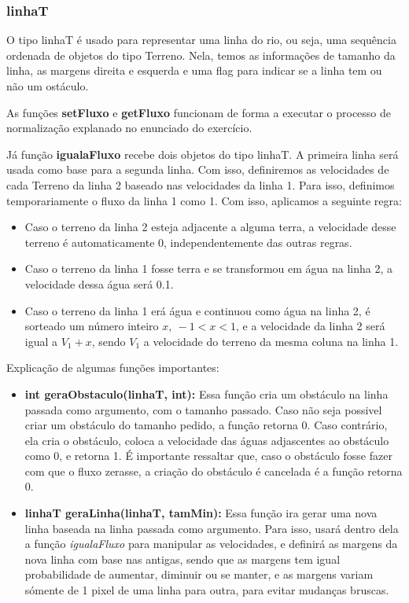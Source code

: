 \documentclass[11pt]{article}
\begin{document}
\subsubsection{linhaT}

O tipo linhaT é usado para representar uma linha do rio, ou seja, uma sequência ordenada de objetos do tipo Terreno. Nela, temos as informações de tamanho da linha, as margens direita e esquerda e uma flag para indicar se a linha tem ou não um ostáculo.

As funções \textbf{setFluxo} e \textbf{getFluxo} funcionam de forma a executar o processo de normalização explanado no enunciado do exercício.

Já função \textbf{igualaFluxo} recebe dois objetos do tipo linhaT. A primeira linha será usada como base para a segunda linha. Com isso, definiremos as velocidades de cada Terreno da linha 2 baseado nas velocidades da linha 1.
Para isso, definimos temporariamente o fluxo da linha 1 como 1. Com isso, aplicamos a seguinte regra:
\begin{itemize}
	
	\item Caso o terreno da linha 2 esteja adjacente a alguma terra, a velocidade desse terreno é automaticamente 0, independentemente das outras regras.

	\item Caso o terreno da linha 1 fosse terra e se transformou em água na linha 2, a velocidade dessa água será 0.1.

	\item Caso o terreno da linha 1 erá água e continuou como água na linha 2, é sorteado um número inteiro $x,\  -1 < x < 1$, e a velocidade da linha 2 será igual a $V_1 + x$, sendo $V_1$ a velocidade do terreno da mesma coluna na linha 1.
	
\end{itemize}

Explicação de algumas funções importantes:
\begin{itemize}

\item \textbf{int geraObstaculo({\color{red}linhaT}, {\color{red}int}):} Essa função cria um obstáculo na linha passada como argumento, com o tamanho passado. Caso não seja possivel criar um obstáculo do tamanho pedido, a função retorna 0. Caso contrário, ela cria o obstáculo, coloca a velocidade das águas adjascentes ao obstáculo como 0, e retorna 1. É importante ressaltar que, caso o obstáculo fosse fazer com que o fluxo zerasse, a criação do obstáculo é cancelada é a função retorna 0.

\item \textbf{linhaT geraLinha({\color{red}linhaT}, {\color{red}tamMin}):}
Essa função ira gerar uma nova linha baseada na linha passada como argumento. Para isso, usará dentro dela a função \emph{igualaFluxo} para manipular as velocidades, e definirá as margens da nova linha com base nas antigas, sendo que as margens tem igual probabilidade de aumentar, diminuir ou se manter, e as margens variam sómente de 1 pixel de uma linha para outra, para evitar mudanças bruscas.


\end{itemize}
\end{document}
